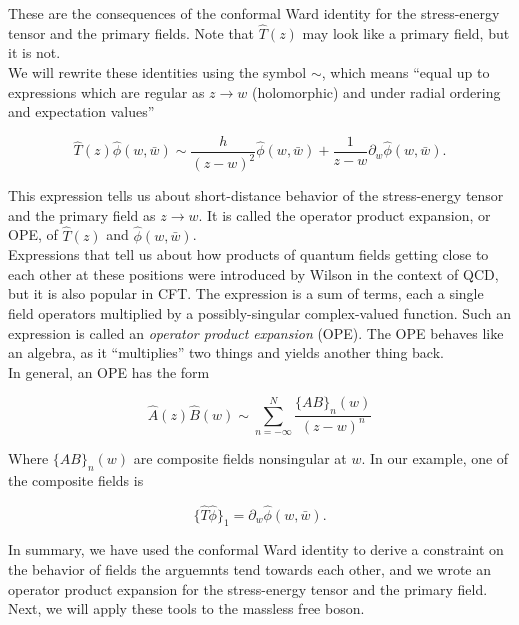 \noindent These are the consequences of the conformal Ward identity for the stress-energy tensor and the primary fields. Note that $\hat{T} (z)$ may look like a primary field, but it is not. \\

\noindent We will rewrite these identities using the symbol $\sim$, which means ``equal up to expressions which are regular as $z\rightarrow w$ (holomorphic) and under radial ordering and expectation values''

\begin{equation}
\hat{T} (z) \hat{\phi} (w, \bar{w}) \sim \frac{h}{(z-w)^2} \hat{\phi} (w, \bar{w}) + \frac{1}{z-w} \partial_w \hat{\phi} (w,\bar{w}) .
\end{equation}

\noindent This expression tells us about short-distance behavior of the stress-energy tensor and the primary field as $z \rightarrow w$. It is called the operator product expansion, or OPE, of  $\hat{T} (z)$ and $\hat{\phi} (w, \bar{w})$. \\

\noindent Expressions that tell us about how products of quantum fields getting close to each other at these positions were introduced by Wilson in the context of QCD, but it is also popular in CFT. The expression is a sum of terms, each a single field operators multiplied by a possibly-singular complex-valued function. Such an expression is called an \textit{operator product expansion} (OPE). The OPE behaves like an algebra, as it ``multiplies'' two things and yields another thing back. \\

\noindent In general, an OPE has the form

\begin{equation}
\hat{A} (z) \hat{B} (w) \sim \sum_{n=-\infty}^N \frac{\{AB\}_n (w)}{(z-w)^n}
\end{equation}

\noindent Where $\{AB\}_n (w)$ are composite fields nonsingular at $w$. In our example, one of the composite fields is 

\begin{equation}
\{\hat{T} \hat{\phi}\}_1 = \partial_w \hat{\phi} (w,\bar{w}).
\end{equation}

\noindent In summary, we have used the conformal Ward identity to derive a constraint on the behavior of fields the arguemnts tend towards each other, and we wrote an operator product expansion for the stress-energy tensor and the primary field. Next, we will apply these tools to the massless free boson.
